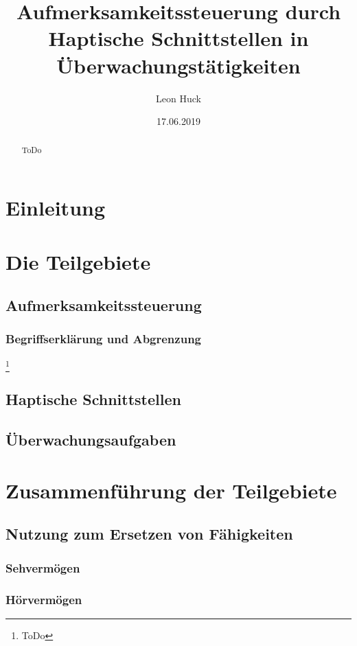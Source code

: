 \documentclass{llncs}					%
\title{Aufmerksamkeitssteuerung durch Haptische Schnittstellen in Überwachungstätigkeiten}
\author{Leon Huck}
\institute{Karlsruher Institut für Technology}
\date{17.06.2019}
\begin{document}
	
\maketitle

\begin{abstract}
	ToDo
\end{abstract}

\newpage
\tableofcontents
\newpage

\newpage
\section{Einleitung}
\section{Die Teilgebiete}
\subsection{Aufmerksamkeitssteuerung}
\subsubsection{Begriffserklärung und Abgrenzung}
\cite{tan2003haptic}\footnote{ToDo}

\subsection{Haptische Schnittstellen}
\subsection{Überwachungsaufgaben}

\section{Zusammenführung der Teilgebiete}
\subsection{Nutzung zum Ersetzen von Fähigkeiten}
\subsubsection{Sehvermögen}
\subsubsection{Hörvermögen}
\end{document}
